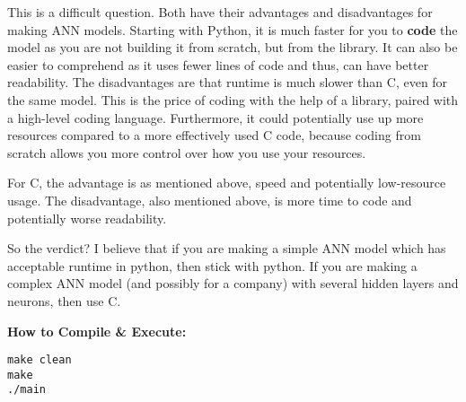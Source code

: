 \documentclass[12pt]{article}
\begin{document}
This is a difficult question. Both have their advantages and disadvantages for making ANN models. Starting with Python, it is much faster for you to \textbf{code} the model as you are not building it from scratch, but from the  library. It can also be easier to comprehend as it uses fewer lines of code and thus, can have better readability. The disadvantages are that runtime is much slower than C, even for the same model. This is the price of coding with the help of a library, paired with a high-level coding language. Furthermore, it could potentially use up more resources compared to a more effectively used C code, because coding from scratch allows you more control over how you use your resources. 

For C, the advantage is as mentioned above, speed and potentially low-resource usage. The disadvantage, also mentioned above, is more time to code and potentially worse readability.

So the verdict? I believe that if you are making a simple ANN model which has acceptable runtime in python, then stick with python. If you are making a complex ANN model (and possibly for a company) with several hidden layers and neurons, then use C.

\setlength{\parindent}{0pt} %

\vspace{\baselineskip}
\vspace{\baselineskip}
{\fontsize{15}{14}\selectfont\textcolor{BurntOrange}{\textbf{How to Compile \& Execute:}}}
\vspace{\baselineskip}
\lstset{style=mystyle}
\begin{lstlisting}
make clean
make
./main
\end{lstlisting}
\end{document}
